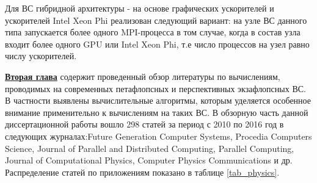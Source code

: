 Для ВС гибридной архитектуры - на основе графических ускорителей и ускорителей Intel Xeon Phi реализован следующий вариант: на узле ВС данного типа запускается более одного MPI-процесса в том случае, когда в состав узла входит более одного GPU или Intel Xeon Phi, т.е число процессов на узел равно числу ускорителей.



\underline{\textbf{Вторая глава}} содержит проведенный обзор литературы по вычислениям, проводимых на современных петафлопсных и перспективных экзафлопсных ВС. В частности выявлены вычислительные алгоритмы, которым уделяется особенное внимание применительно к вычислениям на таких ВС.
В обзорную часть данной диссертационной работы вошло 298 статей за период с 2010 по 2016 год в следующих журналах:Future Generation Computer Systems, Procedia Computers Science, Journal of Parallel and Distributed Computing, Parallel Computing, Journal of Computational Physics, Computer Physics Communications и др.  Распределение статей по приложениям показано в таблице \ref{tab_physics}.

